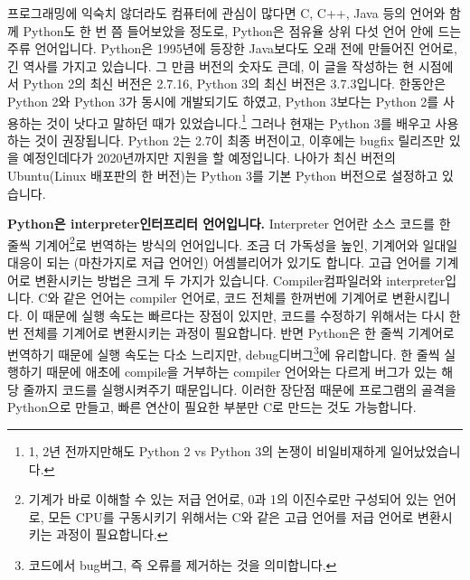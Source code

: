 \documentclass[../main.tex]{subfiles}
\begin{document}
프로그래밍에 익숙치 않더라도 컴퓨터에 관심이 많다면 C, C++, Java 등의 언어와 함께 Python도 한 번 쯤 들어보았을 정도로, Python은 점유율 상위 다섯 언어 안에 드는 주류 언어입니다.
Python은 1995년에 등장한 Java보다도 오래 전에 만들어진 언어로, 긴 역사를 가지고 있습니다.
그 만큼 버전의 숫자도 큰데, 이 글을 작성하는 현 시점에서 Python 2의 최신 버전은 2.7.16, Python 3의 최신 버전은 3.7.3입니다.
한동안은 Python 2와 Python 3가 동시에 개발되기도 하였고, Python 3보다는 Python 2를 사용하는 것이 낫다고 말하던 때가 있었습니다.\footnote{1, 2년 전까지만해도 Python 2 vs Python 3의 논쟁이 비일비재하게 일어났었습니다.}
그러나 현재는 Python 3를 배우고 사용하는 것이 권장됩니다.
Python 2는 2.7이 최종 버전이고, 이후에는 bugfix 릴리즈만 있을 예정인데다가 2020년까지만 지원을 할 예정입니다.
나아가 최신 버전의 Ubuntu(Linux 배포판의 한 버전)는 Python 3를 기본 Python 버전으로 설정하고 있습니다.

\textbf{Python은 interpreter인터프리터 언어입니다.}
Interpreter 언어란 소스 코드를 한 줄씩 기계어\footnote{기계가 바로 이해할 수 있는 저급 언어로, 0과 1의 이진수로만 구성되어 있는 언어로, 모든 CPU를 구동시키기 위해서는 C와 같은 고급 언어를 저급 언어로 변환시키는 과정이 필요합니다.}로 번역하는 방식의 언어입니다.
조금 더 가독성을 높인, 기계어와 일대일 대응이 되는 (마찬가지로 저급 언어인) 어셈블리어가 있기도 합니다.
고급 언어를 기계어로 변환시키는 방법은 크게 두 가지가 있습니다.
Compiler컴파일러와 interpreter입니다.
C와 같은 언어는 compiler 언어로, 코드 전체를 한꺼번에 기계어로 변환시킵니다.
이 때문에 실행 속도는 빠르다는 장점이 있지만, 코드를 수정하기 위해서는 다시 한 번 전체를 기계어로 변환시키는 과정이 필요합니다.
반면 Python은 한 줄씩 기계어로 번역하기 때문에 실행 속도는 다소 느리지만, debug디버그\footnote{코드에서 bug버그, 즉 오류를 제거하는 것을 의미합니다.}에 유리합니다.
한 줄씩 실행하기 때문에 애초에 compile을 거부하는 compiler 언어와는 다르게 버그가 있는 해당 줄까지 코드를 실행시켜주기 때문입니다.
이러한 장단점 때문에 프로그램의 골격을 Python으로 만들고, 빠른 연산이 필요한 부분만 C로 만드는 것도 가능합니다.
\end{document}
